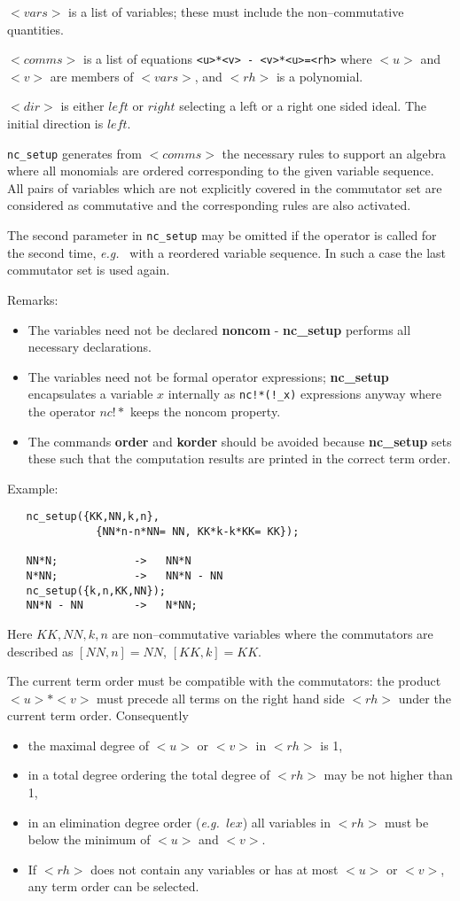 $<vars>$ is a list of variables; these must include the
non--commutative quantities.

$<comms>$ is a list of equations \verb&<u>*<v> - <v>*<u>=<rh>&
where $<u>$ and $<v>$ are members of $<vars>$, and $<rh>$ is
a polynomial.

$<dir>$ is either $left$ or $right$ selecting a left or a
right one sided ideal. The initial direction is $left$.

{\tt nc\_setup} generates from $<comms>$ the necessary
rules to support an algebra where all monomials are
ordered corresponding to the given variable sequence.
All pairs of variables which are not explicitly covered in
the commutator set are considered as commutative and the
corresponding rules are also activated.

The second parameter in {\tt nc\_setup} may be
omitted if the operator is called for the second time,
{\em e.g.\ } with a reordered variable sequence. In such a case
the last commutator set is used again.

Remarks: \begin{itemize}
\item The variables need not be declared {\bf noncom} -
    {\bf nc\_setup} performs all necessary declarations.
\item The variables need not be formal operator expressions;
    {\bf nc\_setup} encapsulates a variable $x$ internally
    as \verb+nc!*(!_x)+ expressions anyway where the operator $nc!*$
    keeps the noncom property.
\item The commands {\bf order} and {\bf korder} should be avoided
    because {\bf nc\_setup} sets these such that the computation
    results are printed in the correct term order.
\end{itemize}

Example:
\begin{verbatim}
   nc_setup({KK,NN,k,n},
              {NN*n-n*NN= NN, KK*k-k*KK= KK});

   NN*N;            ->   NN*N
   N*NN;            ->   NN*N - NN
   nc_setup({k,n,KK,NN});
   NN*N - NN        ->   N*NN;

\end{verbatim}
Here $KK,NN,k,n$ are non--commutative variables where
the commutators are described as $[NN,n]=NN$, $[KK,k]=KK$.

The current term order must be compatible with the commutators:
the product $<u>*<v>$ must precede all terms on the right hand
side $<rh>$ under the current term order. Consequently
\begin{itemize}
\item the maximal degree of $<u>$ or $<v>$ in $<rh>$ is 1,
\item in a total degree ordering the total degree of $<rh>$ may be not
higher than 1,
\item in an elimination degree order ({\em e.g.\ }$lex$) all variables in
$<rh>$ must be below the minimum of $<u>$ and $<v>$.
\item If $<rh>$ does not contain any variables or has at most $<u>$ or
$<v>$, any term order can be selected.
\end{itemize}

